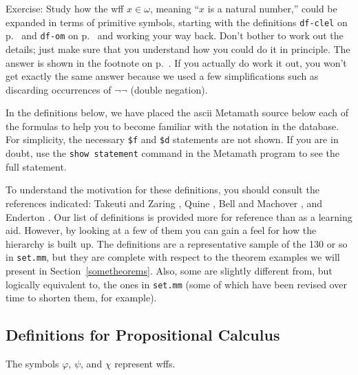 Exercise:  Study how the wff $x\in\omega$, meaning ``$x$ is a natural
number,'' could be expanded in terms of primitive symbols, starting with the
definitions \texttt{df-clel} on p.~\pageref{dfclel} and \texttt{df-om} on
p.~\pageref{dfom} and working your way back.  Don't bother to work out the
details; just make sure that you understand how you could do it in principle.
The answer is shown in the footnote on p.~\pageref{expandom}.  If you
actually do work it out, you won't get exactly the same answer because we used
a few simplifications such as discarding occurrences of $\lnot\lnot$ (double
negation).

In the definitions below, we have placed the {\sc ascii} Metamath source
below each of the formulas to help you to become familiar with the
notation in the database.  For simplicity, the necessary \texttt{\$f}
and \texttt{\$d} statements are not shown.  If you are in doubt, use the
\texttt{show statement} command
in the Metamath program to see the full statement.

To understand the motivation for these definitions, you should consult the
references indicated:  Takeuti and Zaring \cite{Takeuti},
Quine \cite{Quine}, Bell and Machover
\cite{Bell}, and Enderton \cite{Enderton}.  Our list of definitions is provided more for reference than as a
learning aid.  However, by looking at a few of them you can gain a feel for
how the hierarchy is built up.  The definitions are a representative sample of
the 130 or so in \texttt{set.mm}, but they are complete with respect to the
theorem examples we will present in Section~\ref{sometheorems}.  Also, some are
slightly different from, but logically equivalent to, the ones in \texttt{set.mm}
(some of which have been revised over time to shorten them, for example).

\subsection{Definitions for Propositional Calculus}\label{metadefprop}

The symbols $\varphi$, $\psi$, and $\chi$ represent wffs.

